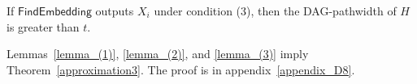 \documentclass[runningheads]{llncs}
\theoremstyle{plain}
\theoremstyle{definition}
\begin{document}
\begin{comment}
\ifthenelse{\boolean{Draft}}{
\begin{figure*}[t]
    \centering
    \begin{minipage}[c]{0.48\textwidth}
        \centering
        \texttt{[image: pic13.eps]}
        \vspace{0.0cm}
        \caption{Illustration of the proof of \textbf{Lemma~\ref{blue_reachable}}. The recent common descendant of $r_0$ and $v$ is denoted as $r_0'$. The proof demonstrates that a contradiction arises if the blue vertex $v$ is not included in $G_{r_0}$, which consists of $r_0$ and its descendants.}
        \label{fig:13}
    \end{minipage}
    \hfill
    \begin{minipage}[c]{0.48\textwidth}
        \centering
        \texttt{[image: pic14.eps]}
        \vspace{0.0cm}
        \caption{Illustration of the proof of \textbf{Lemma~\ref{lemma_(3)}}. The blue vertices represent blue, the red check-marked vertices indicate token-removed vertices, and the other red vertices indicate vertices with tokens placed on them. The proof demonstrates that a contradiction arises if there are no vertices in $V_{h(M_{t, d, l})}$.}
        \label{fig:14}
    \end{minipage}
\end{figure*}
}
\end{comment}


\begin{lemma}\label{lemma_(3)}
    If $\mathsf{FindEmbedding}$ outputs $X_i$ under condition (3), then the DAG-pathwidth of $H$ is greater than $t$.
\end{lemma}


Lemmas~\ref{lemma_(1)}, \ref{lemma_(2)}, and \ref{lemma_(3)} imply Theorem~\ref{approximation3}. The proof is in appendix~\ref{appendix_D8}.
\end{document}
